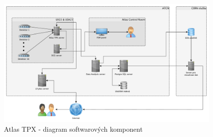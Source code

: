 \begin{figure}[th]
	\begin{center}
		\includegraphics[width=16cm]{figures/atlas_tpx_sw_diagram.pdf}
		\caption{Atlas TPX - diagram softwarových komponent}
		\label{fig:tpx_sw_diagram}
	\end{center}
\end{figure}

